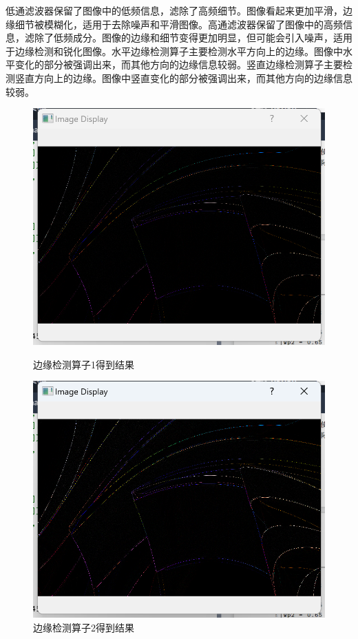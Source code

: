 \documentclass[a4paper,12pt]{article}
\begin{document}
低通滤波器保留了图像中的低频信息，滤除了高频细节。图像看起来更加平滑，边缘细节被模糊化，适用于去除噪声和平滑图像。高通滤波器保留了图像中的高频信息，滤除了低频成分。图像的边缘和细节变得更加明显，但可能会引入噪声，适用于边缘检测和锐化图像。水平边缘检测算子主要检测水平方向上的边缘。图像中水平变化的部分被强调出来，而其他方向的边缘信息较弱。竖直边缘检测算子主要检测竖直方向上的边缘。图像中竖直变化的部分被强调出来，而其他方向的边缘信息较弱。
\begin{figure}[htbp]
    \centering
    \begin{minipage}[b]{0.48\textwidth}
        \centering
        \includegraphics[width=\linewidth]{images/Design/image_processing/1/edge_1.png}
        \caption{边缘检测算子1得到结果}
    \end{minipage}
    \hfill
    \begin{minipage}[b]{0.48\textwidth}
        \centering
        \includegraphics[width=\linewidth]{images/Design/image_processing/1/edge_2.png}
        \caption{边缘检测算子2得到结果}
    \end{minipage}
    

\end{figure}
\end{document}
